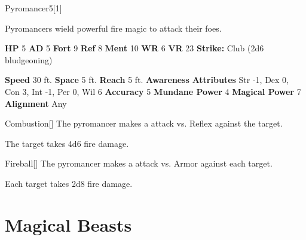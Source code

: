   
  \begin{monsection}{Pyromancer}{5}[1]
    \vspace{-1em}\vspace{-1em}
    \vspace{0em}

    
      Pyromancers wield powerful fire magic to attack their foes.
    
    

    \begin{spellcontent}
      \begin{spelltargetinginfo}
        \pari \textbf{HP} 5 \monsep
          \textbf{AD} 5 \monsep
          \textbf{Fort} 9 \monsep
          \textbf{Ref} 8 \monsep
          \textbf{Ment} 10
        \pari \textbf{WR} 6 \monsep
        \textbf{VR} 23
        \pari \textbf{Strike:}
            Club  (2d6 bludgeoning)
      \end{spelltargetinginfo}
    \end{spellcontent}
    \begin{monsterfooter}
      \pari \textbf{Speed} 30 ft. \monsep
        \textbf{Space} 5 ft. \monsep
        \textbf{Reach} 5 ft.
      \pari \textbf{Awareness} 
      \pari \textbf{Attributes}
        Str -1, Dex 0,
        Con 3, Int -1,
        Per 0, Wil 6
      \pari \textbf{Accuracy} 5 \monsep
        \textbf{Mundane Power} 4 \monsep
      \textbf{Magical Power} 7
      \pari \textbf{Alignment} Any
    \end{monsterfooter}
  \end{monsection}
  \begin{freeability}{Combustion}[]
       The pyromancer makes a  attack
        vs. Reflex against the target.
    
    \hit The target takes 4d6 fire damage.
    \end{freeability}
  

    \begin{freeability}{Fireball}[]
       The pyromancer makes a  attack
        vs. Armor against each target.
    
    \hit Each target takes 2d8 fire damage.
    \end{freeability}
  
        \section{Magical Beasts}

